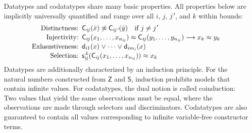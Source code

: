 \documentclass[letter]{article}
\theoremstyle{plain}
\theoremstyle{definition}
\newcommand\jPrime{j\vthinspace'\negvthinspace}
\newcommand\const[1]{\textsf{#1}}
\newcommand\medrightarrow{\mathrel{{{\color{black}\relbar}\kern-0.9ex\rlap{\color{white}\ensuremath{\blacksquare}}\kern-0.9ex}\joinrel{\color{black}\rightarrow}}}
\newcommand{\teq}{\approx}
\newcommand{\tneq}{\not\teq}
\newcommand\vthinspace{\kern+0.083333em}
\newcommand\negvthinspace{\kern-0.083333em}
\begin{document}
Datatypes and codatatypes share many basic properties. All properties
below are implicitly universally quantified and range over all $i$, $j$,
$\jPrime$, and $k$ within bounds:
%
\[
\!\begin{aligned}[t]
\text{Distinctness:}\enskip
  & %
    \smash{\const{C}_{i\negvthinspace j}(\bar x) \tneq \const{C}_{i\negvthinspace \jPrime}(\bar y) \quad\text{if $j \not= \jPrime$}}
  \\[-0.5\jot]
\text{Injectivity:}\enskip
  & %
    \smash{\const{C}_{i\negvthinspace j}(x_1,\dotsc,x_{n_{i\negvthinspace j}}) \teq \const{C}_{i\negvthinspace j}(y_1,\dotsc,y_{n_{i\negvthinspace j}}) \medrightarrow x_k \teq y_k}
  \\[-0.5\jot]
\text{Exhaustiveness:}\enskip
  & \smash{\const{d}_{i1}(x) \mathrel\lor \cdots \mathrel\lor \const{d}_{im_i}(x)}
  \\[-0.5\jot]
\text{Selection:}\enskip
  & \smash{\const{s}_{i\negvthinspace j}^{\,k}(\const{C}_{i\negvthinspace j}(x_1,\dotsc,x_{n_{i\negvthinspace j}})) \teq x_k}
\end{aligned}
\]
%
%
%
%
%
Datatypes are additionally characterized by an induction principle.
For the natural numbers constructed from $\const{Z}$ and $\const{S}$,
induction prohibits models that contain infinite values.
%
For codatatypes, the dual notion is called coinduction:
Two values that yield the same observations must be equal, 
where the observations are made through selectors and discriminators.
Codatatypes are also guaranteed to contain all values corresponding to 
infinite variable-free constructor terms.
\end{document}
